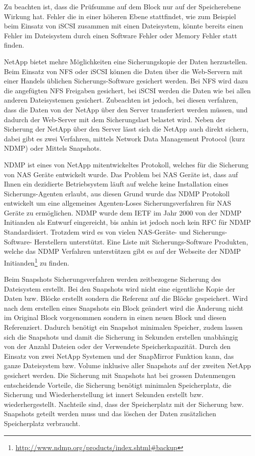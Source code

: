 Zu beachten ist, dass die Prüfsumme auf dem Block nur auf der Speicherebene Wirkung hat. Fehler die in einer höheren Ebene stattfindet, wie zum Beispiel beim Einsatz von iSCSI zusammen mit einen Dateisystem, könnte bereits einen Fehler im Dateisystem durch einen Software Fehler oder Memory Fehler statt finden. 

NetApp bietet mehre Möglichkeiten eine Sicherungskopie der Daten herzustellen. Beim Einsatz von NFS oder iSCSI können die Daten über die Web-Servern mit einer Handels üblichen Sicherungs-Software gesichert werden. Bei NFS wird dazu die angefügten NFS Freigaben gesichert, bei iSCSI werden die Daten wie bei allen anderen Dateisystemen gesichert. Zubeachten ist jedoch, bei diesen verfahren, dass die Daten von der NetApp über den Server transferiert werden müssen, und dadurch der Web-Server mit dem Sicherungslast belastet wird. Neben der Sicherung der NetApp über den Server lässt sich die NetApp auch direkt sichern, dabei gibt es zwei Verfahren, mittels  Network Data Management Protocol (kurz NDMP) oder Mittels Snapshots. 

NDMP ist eines von NetApp mitentwickeltes Protokoll, welches für die Sicherung von NAS Geräte entwickelt wurde. Das Problem bei NAS Geräte ist, dass auf Ihnen ein dezidierte Betriebsystem läuft auf welche keine Installation eines Sicherungs-Agenten erlaubt, aus diesen Grund wurde das NDMP Protokoll entwickelt um eine allgemeines Agenten-Loses Sicherungsverfahren für NAS Geräte zu ermöglichen. NDMP wurde dem IETF im Jahr 2000 von der NDMP Initianden als Entwurf eingereicht, bis anhin ist jedoch noch kein RFC für NDMP Standardisiert. Trotzdem wird es von vielen NAS-Geräte- und Sicherungs-Software- Herstellern unterstützt. Eine Liste mit Sicherungs-Software Produkten, welche das NDMP Verfahren unterstützen gibt es auf der Webseite der NDMP Initianden\footnote{\url{http://www.ndmp.org/products/index.shtml#backup}} zu finden.\cite{NDMP.orga}\cite{NDMP.org}

Beim Snapshots Sicherungsverfahren werden zeitbezogene Sicherung des Dateisystem  erstellt. Bei den Snapshots wird nicht eine eigentliche Kopie der Daten bzw. Blöcke erstellt sondern die Referenz auf die Blöcke gespeichert. Wird nach dem erstellen eines Snapshots ein Block geändert wird die Änderung nicht im Original Block vorgenommen sondern in einen neuen Block und diesen Referenziert. Dadurch benötigt ein Snapshot minimalen Speicher, zudem lassen sich die Snapshots und damit die Sicherung in Sekunden erstellen unabhängig von der Anzahl Dateien oder der Verwendete Speicherkapazität. Durch den Einsatz von zwei NetApp Systemen und der SnapMirror Funktion kann, das ganze Dateisystem bzw. Volume inklusive aller Snapshots auf der zweiten NetApp gesichert werden. Die Sicherung mit Snapshots hat bei grossen Datenmengen entscheidende Vorteile, die Sicherung benötigt minimalen Speicherplatz, die Sicherung und Wiederherstellung ist innert Sekunden erstellt bzw. wiederhergestellt. Nachteile sind, dass der Speicherplatz mit der Sicherung bzw. Snapshots geteilt werden muss und das löschen der Daten zusätzlichen Speicherplatz verbraucht.

